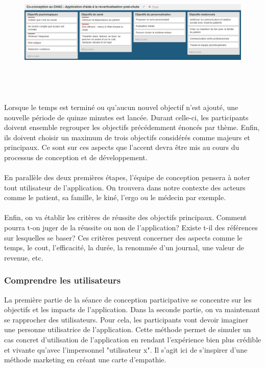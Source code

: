 \begin{figure}
	\centering
	\includegraphics[width = 16cm, height=6cm]{images/objectifs_ales.png}
	\caption{}
	\label{objectifs_ales}
\end{figure}

\paragraph{} Lorsque le temps est terminé ou qu'aucun nouvel objectif n'est ajouté, une nouvelle période de quinze minutes est lancée. Durant celle-ci, les participants doivent ensemble regrouper les objectifs précédemment énoncés par thème. Enfin, ils doivent choisir un maximum de trois objectifs considérés comme majeurs et principaux. Ce sont sur ces aspects que l'accent devra être mis au cours du processus de conception et de développement.

\paragraph{}En parallèle des deux premières étapes, l'équipe de conception pensera à noter tout utilisateur de l'application. On trouvera dans notre contexte des acteurs comme le patient, sa famille, le kiné, l'ergo ou le médecin par exemple.

\paragraph{}Enfin, on va établir les critères de réussite des objectifs principaux. Comment pourra t-on juger de la réussite ou non de l'application? Existe t-il des références sur lesquelles se baser? Ces critères peuvent concerner des aspects comme le temps, le cout, l'efficacité, la durée, la renommée d'un journal, une valeur de revenue, etc.

	
	\subsubsection*{Comprendre les utilisateurs}
La première partie de la séance de conception participative se concentre sur les objectifs et les impacts de l'application. Dans la seconde partie, on va maintenant se rapprocher 	des utilisateurs. Pour cela, les participants vont devoir imaginer une personne utilisatrice de l'application. Cette méthode permet de simuler un cas concret d'utilisation de l'application en rendant l'expérience bien plus crédible et vivante qu'avec l'impersonnel "utilisateur x". Il s'agit ici de s'inspirer d'une méthode marketing en créant une carte d'empathie.

